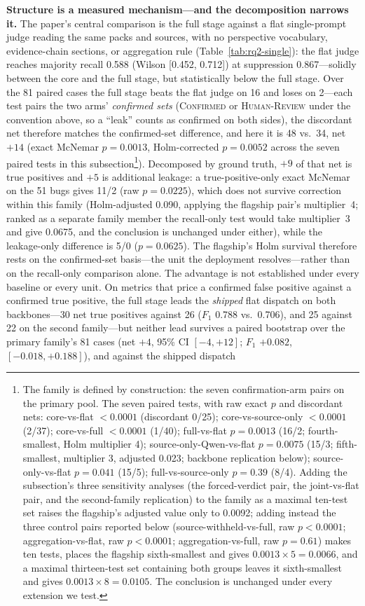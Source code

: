 \documentclass[acmsmall,screen,review,anonymous]{acmart}
\begin{document}
\textbf{Structure is a measured mechanism---and the decomposition narrows it.}
The paper's central comparison is the full stage against a flat single-prompt judge reading the same packs and sources, with no perspective vocabulary, evidence-chain sections, or aggregation rule (Table~\ref{tab:rq2-single}): the flat judge reaches majority recall 0.588 (Wilson [0.452, 0.712]) at suppression 0.867---solidly between the core and the full stage, but statistically below the full stage. Over the 81 paired cases the full stage beats the flat judge on 16 and loses on 2---each test pairs the two arms' \emph{confirmed sets} (\textsc{Confirmed} or \textsc{Human-Review} under the convention above, so a ``leak'' counts as confirmed on both sides), the discordant net therefore matches the confirmed-set difference, and here it is 48 vs.\ 34, net $+14$ (exact McNemar $p{=}0.0013$, Holm-corrected $p{=}0.0052$ across the seven paired tests in this subsection\footnote{The family is defined by construction: the seven confirmation-arm pairs on the primary pool. The seven paired tests, with raw exact $p$ and discordant nets: core-vs-flat $<0.0001$ (discordant 0/25); core-vs-source-only $<0.0001$ (2/37); core-vs-full $<0.0001$ (1/40); full-vs-flat $p{=}0.0013$ (16/2; fourth-smallest, Holm multiplier 4); source-only-Qwen-vs-flat $p{=}0.0075$ (15/3; fifth-smallest, multiplier 3, adjusted 0.023; backbone replication below); source-only-vs-flat $p{=}0.041$ (15/5); full-vs-source-only $p{=}0.39$ (8/4). Adding the subsection's three sensitivity analyses (the forced-verdict pair, the joint-vs-flat pair, and the second-family replication) to the family as a maximal ten-test set raises the flagship's adjusted value only to 0.0092; adding instead the three control pairs reported below (source-withheld-vs-full, raw $p{<}0.0001$; aggregation-vs-flat, raw $p{<}0.0001$; aggregation-vs-full, raw $p{=}0.61$) makes ten tests, places the flagship sixth-smallest and gives $0.0013\times5=0.0066$, and a maximal thirteen-test set containing both groups leaves it sixth-smallest and gives $0.0013\times8=0.0105$. The conclusion is unchanged under every extension we test.}). Decomposed by ground truth, $+9$ of that net is true positives and $+5$ is additional leakage: a true-positive-only exact McNemar on the 51 bugs gives 11/2 (raw $p{=}0.0225$), which does not survive correction within this family (Holm-adjusted 0.090, applying the flagship pair's multiplier~4; ranked as a separate family member the recall-only test would take multiplier~3 and give 0.0675, and the conclusion is unchanged under either), while the leakage-only difference is 5/0 ($p{=}0.0625$). The flagship's Holm survival therefore rests on the confirmed-set basis---the unit the deployment resolves---rather than on the recall-only comparison alone. The advantage is not established under every baseline or every unit. On metrics that price a confirmed false positive against a confirmed true positive, the full stage leads the \emph{shipped} flat dispatch on both backbones---30 net true positives against 26 ($F_1$ 0.788 vs.\ 0.706), and 25 against 22 on the second family---but neither lead survives a paired bootstrap over the primary family's 81 cases (net $+4$, 95\% CI $[-4, +12]$; $F_1$ $+0.082$, $[-0.018, +0.188]$), and against the shipped dispatch 
\end{document}
